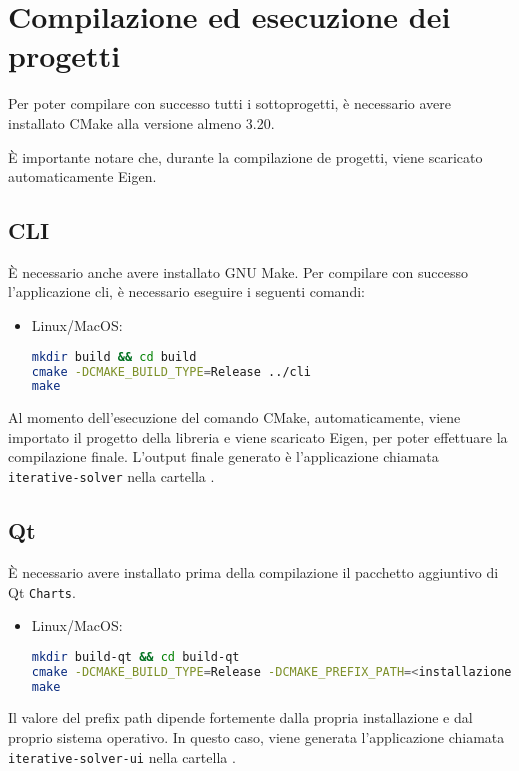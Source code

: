 \documentclass[11pt, a4paper]{article}
\begin{document}
	
	\thispagestyle{empty}
	\newpage
	\pagestyle{fancy}
	
	
	\tableofcontents
	
	\newpage
	
	\hypersetup{
		linkbordercolor=fireenginered
	}
	
	
	
	
	\appendix
	\section{Compilazione ed esecuzione dei progetti}
	Per poter compilare con successo tutti i sottoprogetti, è necessario avere installato CMake alla versione almeno 3.20.
	
	È importante notare che, durante la compilazione de progetti, viene scaricato automaticamente Eigen.
	
	\subsection{CLI}
	È necessario anche avere installato GNU Make.
	Per compilare con successo l'applicazione cli, è necessario eseguire i seguenti comandi:
	\begin{itemize}
		\item Linux/MacOS: 
		\begin{lstlisting}[language=Bash]
mkdir build && cd build
cmake -DCMAKE_BUILD_TYPE=Release ../cli
make \end{lstlisting}
	\end{itemize}
	
	
	Al momento dell'esecuzione del comando CMake, automaticamente, viene importato il progetto della libreria e viene scaricato Eigen, per poter effettuare la compilazione finale. L'output finale generato è l'applicazione chiamata \texttt{iterative-solver} nella cartella .
	
\subsection{Qt}
È necessario avere installato prima della compilazione il pacchetto aggiuntivo di Qt \texttt{Charts}.
	\begin{itemize}
	\item Linux/MacOS: 
	\begin{lstlisting}[language=Bash]
mkdir build-qt && cd build-qt
cmake -DCMAKE_BUILD_TYPE=Release -DCMAKE_PREFIX_PATH=<installazione di Qt>/<versione>/<sistema> ../QTInterface
make \end{lstlisting}
\end{itemize}
Il valore del prefix path dipende fortemente dalla propria installazione e dal proprio sistema operativo. In questo caso, viene generata l'applicazione chiamata \texttt{iterative-solver-ui} nella cartella .
	\FloatBarrier
	\newpage
	\printbibliography
\end{document}
